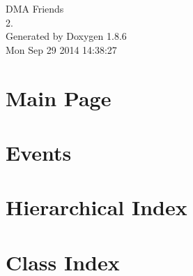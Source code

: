 \documentclass[twoside]{book}
\newcommand{\clearemptydoublepage}{%
  \newpage{\pagestyle{empty}\cleardoublepage}%
}
\begin{document}
\hypersetup{pageanchor=false}
\begin{titlepage}
\vspace*{7cm}
\begin{center}%
{\Large D\-M\-A Friends \\[1ex]\large 2. }\\
\vspace*{1cm}
{\large Generated by Doxygen 1.8.6}\\
\vspace*{0.5cm}
{\small Mon Sep 29 2014 14:38:27}\\
\end{center}
\end{titlepage}
\clearemptydoublepage
\tableofcontents
\clearemptydoublepage
{}
\hypersetup{pageanchor=true}

\chapter{Main Page}
\label{index}\hypertarget{index}{}
\chapter{Events}
\label{df/d0e/md_docs_EVENTS}
\hypertarget{df/d0e/md_docs_EVENTS}{}

\chapter{Hierarchical Index}

\chapter{Class Index}

\end{document}
